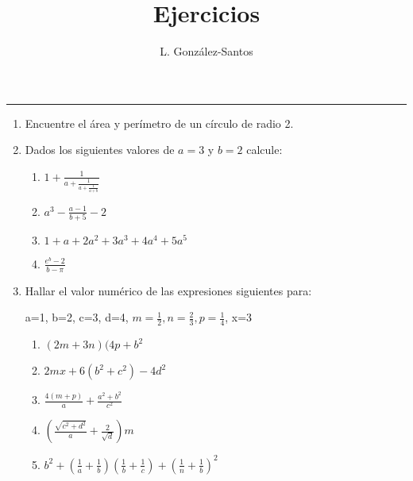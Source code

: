 \documentclass[a4paper]{article}
\title{Ejercicios}
\author{L. González-Santos}
\begin{document}
\maketitle

\hrule

\begin{enumerate}
\item Encuentre el área y perímetro de un  círculo de radio 2.
\item Dados los siguientes valores de $a=3$ y $b=2$ calcule:

\begin{enumerate}
\item $1+ \frac{1}{a+\frac{1}{a+\frac{1}{a+b}}}$
\item $a^3-\frac{a-1}{b+5}-2$
\item $1+a+2a^2+3a^3+ 4a^4 + 5a^5$
\item $\frac{e^b-2}{b-\pi}$
\end{enumerate}

\item Hallar el valor numérico de las expresiones siguientes para:

a=1, b=2, c=3, d=4, $m=\frac{1}{2}, n=\frac{2}{3}, p=\frac{1}{4}$, x=3

\begin{enumerate}
\item $(2m+3n)(4p + b^2$
\item $2mx + 6(b^2 + c^2) - 4d^2$
\item $\frac{4(m+p)}{a} + \frac{a^2+b^2}{c^2}$
\item $(\frac{\sqrt{c^2+d^2}}{a} + \frac{2}{\sqrt{d}})m$
\item $b^2+(\frac{1}{a}+ \frac{1}{b})(\frac{1}{b}+ \frac{1}{c}) + (\frac{1}{n}+ \frac{1}{b})^2$
\end{enumerate}
\end{enumerate}  
\end{document}
